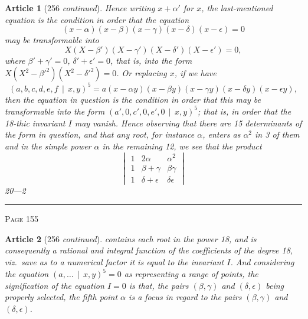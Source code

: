 \documentclass[11pt,a4paper]{article}
\theoremstyle{cayley}
\newtheorem{art}{Article}
\begin{document}
\begin{art}[256 \textit{continued}]
Hence writing $x+\alpha'$ for $x$, the last-mentioned equation is the condition in order that the equation
\[
(x-\alpha)(x-\beta)(x-\gamma)(x-\delta)(x-\epsilon) = 0
\]
may be transformable into
\[
X(X-\beta')(X-\gamma')(X-\delta')(X-\epsilon') = 0,
\]
where $\beta'+\gamma'=0$, $\delta'+\epsilon'=0$, that is, into the form $X(X^2-\beta'^2)(X^2-\delta'^2) = 0$. Or replacing $x$, if we have
\[
(a, b, c, d, e, f \,\mid\, x, y)^5 = a(x-\alpha y)(x-\beta y)(x-\gamma y)(x-\delta y)(x-\epsilon y),
\]
then the equation in question is the condition in order that this may be transformable into the form $(a', 0, c', 0, e', 0 \,\mid\, x, y)^5$; that is, in order that the 18-thic invariant $I$ may vanish. Hence observing that there are 15 determinants of the form in question, and that any root, for instance $\alpha$, enters as $\alpha^2$ in 3 of them and in the simple power $\alpha$ in the remaining 12, we see that the product
\[
\begin{vmatrix}
1 & 2\alpha & \alpha^2 \\
1 & \beta+\gamma & \beta\gamma \\
1 & \delta+\epsilon & \delta\epsilon
\end{vmatrix}
\]
\hspace{\fill}20---2
\end{art}

\vspace{1em}
\noindent\rule{\textwidth}{0.4pt}
\begin{center}\textsc{Page 155}\end{center}
\newpage

\begin{art}[256 \textit{continued}]
contains each root in the power 18, and is consequently a rational and integral function of the coefficients of the degree 18, viz.\ save as to a numerical factor it is equal to the invariant $I$. And considering the equation $(a, \ldots \,\mid\, x, y)^5 = 0$ as representing a range of points, the signification of the equation $I=0$ is that, the pairs $(\beta, \gamma)$ and $(\delta, \epsilon)$ being properly selected, the fifth point $\alpha$ is a focus in regard to the pairs $(\beta, \gamma)$ and $(\delta, \epsilon)$.
\end{art}
\end{document}
